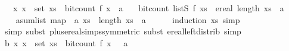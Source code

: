 \begin{isabellebody}
\ \ \ {\isachardoublequoteopen}{\isasymAnd}x{\isachardot}{\kern0pt}\ x\ {\isasymin}\ set\ xs\ {\isasymLongrightarrow}\ bit{\isacharunderscore}{\kern0pt}count\ {\isacharparenleft}{\kern0pt}f\ x{\isacharparenright}{\kern0pt}\ {\isasymle}\ a{\isachardoublequoteclose}\isanewline
\ \ \ {\isachardoublequoteopen}bit{\isacharunderscore}{\kern0pt}count\ {\isacharparenleft}{\kern0pt}list\isactrlsub S\ f\ xs{\isacharparenright}{\kern0pt}\ {\isasymle}\ ereal\ {\isacharparenleft}{\kern0pt}length\ xs{\isacharparenright}{\kern0pt}\ {\isacharasterisk}{\kern0pt}\ {\isacharparenleft}{\kern0pt}a{\isacharplus}{\kern0pt}{}{\isacharparenright}{\kern0pt}\ {\isacharplus}{\kern0pt}\ {}{\isachardoublequoteclose}\isanewline
%
\isadelimproof
%
\endisadelimproof
%
\isatagproof
{}\isamarkupfalse%
\ {\isacharminus}{\kern0pt}\isanewline
\ \ \isamarkupfalse%
\ a{\isacharcolon}{\kern0pt}{\isachardoublequoteopen}sum{\isacharunderscore}{\kern0pt}list\ {\isacharparenleft}{\kern0pt}map\ {\isacharparenleft}{\kern0pt}{\isasymlambda}{\isacharunderscore}{\kern0pt}{\isachardot}{\kern0pt}\ {\isacharparenleft}{\kern0pt}a{\isacharplus}{\kern0pt}{}{\isacharparenright}{\kern0pt}{\isacharparenright}{\kern0pt}\ xs{\isacharparenright}{\kern0pt}\ {\isacharequal}{\kern0pt}\ length\ xs\ {\isacharasterisk}{\kern0pt}\ {\isacharparenleft}{\kern0pt}a{\isacharplus}{\kern0pt}{}{\isacharparenright}{\kern0pt}{\isachardoublequoteclose}\isanewline
\ \ \ \ \isamarkupfalse%
\ {\isacharparenleft}{\kern0pt}induction\ xs{\isacharcomma}{\kern0pt}\ simp{\isacharparenright}{\kern0pt}\isanewline
\ \ \ \ \isamarkupfalse%
\ {\isacharparenleft}{\kern0pt}simp{\isacharcomma}{\kern0pt}\ subst\ plus{\isacharunderscore}{\kern0pt}ereal{\isachardot}{\kern0pt}simps{\isacharparenleft}{\kern0pt}{}{\isacharparenright}{\kern0pt}{\isacharbrackleft}{\kern0pt}symmetric{\isacharbrackright}{\kern0pt}{\isacharcomma}{\kern0pt}\ subst\ ereal{\isacharunderscore}{\kern0pt}left{\isacharunderscore}{\kern0pt}distrib{\isacharcomma}{\kern0pt}\ simp{\isacharplus}{\kern0pt}{\isacharparenright}{\kern0pt}\isanewline
\isanewline
\ \ \isamarkupfalse%
\ b{\isacharcolon}{\kern0pt}\ {\isachardoublequoteopen}{\isasymAnd}x{\isachardot}{\kern0pt}\ x\ {\isasymin}\ set\ xs\ {\isasymLongrightarrow}\ bit{\isacharunderscore}{\kern0pt}count\ {\isacharparenleft}{\kern0pt}f\ x{\isacharparenright}{\kern0pt}\ {\isacharplus}{\kern0pt}{}\ {\isasymle}\ a{\isacharplus}{\kern0pt}{}{\isachardoublequoteclose}\isanewline

\end{isabellebody}
